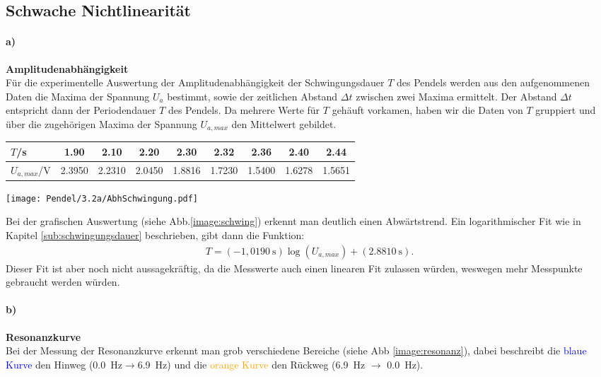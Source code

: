 \subsection{Schwache Nichtlinearität}
\label{sub:AuswertungweakLin}
\paragraph{a)} \textbf{Amplitudenabhängigkeit}\\
Für die experimentelle Auswertung der Amplitudenabhängigkeit der Schwingungsdauer $T$ des Pendels  werden aus den aufgenommenen Daten die Maxima der Spannung $U_{a}$ bestimmt, sowie der zeitlichen Abstand $\Delta t$ zwischen zwei Maxima ermittelt. Der Abstand $\Delta t$ entspricht dann der Periodendauer $T$ des Pendels. Da mehrere Werte für $T$ gehäuft vorkamen, haben wir die Daten von $T$ gruppiert und über die zugehörigen Maxima der Spannung $U_{a,max}$ den Mittelwert gebildet.
\begin{center}
    \begin{tabular}{l|c c c c c c c c}
        $T$/s & 1.90 & 2.10 & 2.20 & 2.30 & 2.32 & 2.36 & 2.40 & 2.44\\
        \hline
        $U_{a,max}$/V &  2.3950  &  2.2310  &  2.0450  &  1.8816  &  1.7230  &  1.5400  &  1.6278  &  1.5651 \\
        \end{tabular}
\end{center}
\begin{center}
    \texttt{[image: Pendel/3.2a/AbhSchwingung.pdf]}
    \label{image:schwing}
\end{center}
Bei der grafischen Auswertung (siehe Abb.\ref{image:schwing}) erkennt man deutlich einen Abwärtstrend. Ein logarithmischer Fit wie in Kapitel \ref{sub:schwingungsdauer} beschrieben, gibt dann die Funktion:
\begin{gather}
    T=(-1,0190~\text{s})\log(U_{a,max}) + (2.8810~\text{s}).
\end{gather}
Dieser Fit ist aber noch nicht aussagekräftig, da die Messwerte auch einen linearen Fit zulassen würden, weswegen mehr Messpunkte gebraucht werden würden.
\paragraph{b)} \textbf{Resonanzkurve}\\
Bei der Messung der Resonanzkurve erkennt man grob verschiedene Bereiche (siehe Abb \ref{image:resonanz}), dabei beschreibt die \textcolor{blue}{blaue Kurve} den Hinweg (\SI{0,0}{\hertz}$\rightarrow$\SI{6,9}{\hertz}) und die \textcolor{orange}{orange Kurve} den Rückweg (\SI{6,9}{\hertz} $\rightarrow$ \SI{0,0}{\hertz}).\\


